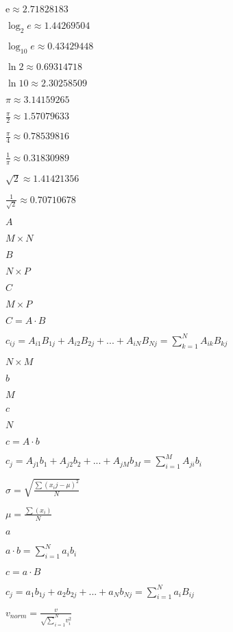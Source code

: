 \documentclass{article}
\begin{document}
$ \mathrm{e} \approx 2.71828183 $
\pagebreak

$ \log_2 e \approx 1.44269504 $
\pagebreak

$ \log_{10} e \approx 0.43429448 $
\pagebreak

$ \ln 2 \approx 0.69314718 $
\pagebreak

$ \ln 10 \approx 2.30258509 $
\pagebreak

$ \pi \approx 3.14159265 $
\pagebreak

$ \frac{\pi}{2} \approx 1.57079633 $
\pagebreak

$ \frac{\pi}{4} \approx 0.78539816 $
\pagebreak

$ \frac{1}{\pi} \approx 0.31830989 $
\pagebreak

$ \sqrt{2} \approx 1.41421356 $
\pagebreak

$ \frac{1}{\sqrt{2}} \approx 0.70710678 $
\pagebreak

$ A $
\pagebreak

$ M \times N $
\pagebreak

$ B $
\pagebreak

$ N \times P $
\pagebreak

$ C $
\pagebreak

$ M \times P $
\pagebreak

$ C = A \cdot B $
\pagebreak

$ c_{ij} = A_{i1} B_{1j} + A_{i2} B_{2j} + ... + A_{iN} B_{Nj} = \sum_{k=1}^{N} A_{ik} B_{kj} $
\pagebreak

$ N \times M $
\pagebreak

$ b $
\pagebreak

$ M $
\pagebreak

$ c $
\pagebreak

$ N $
\pagebreak

$ c = A \cdot b $
\pagebreak

$ c_{j} = A_{j1} b_1 + A_{j2} b_2 + ... + A_{jM} b_M = \sum_{i=1}^{M} A_{ji} b_i $
\pagebreak

$ \sigma = \sqrt{\frac{\sum(x_ij - \mu)^2}{N}} $
\pagebreak

$ \mu = \frac{\sum(x_i)}{N} $
\pagebreak

$ a $
\pagebreak

$ a \cdot b = \sum_{i=1}^{N} a_i b_i $
\pagebreak

$ c = a \cdot B $
\pagebreak

$ c_{j} = a_1 b_{1j} + a_2 b_{2j} + ... + a_N b_{Nj} = \sum_{i=1}^{N} a_i B_{ij} $
\pagebreak

$ v_{norm} = \frac{v}{\sqrt \sum_{i=1}^{N} v_i^2} $
\pagebreak
\end{document}
